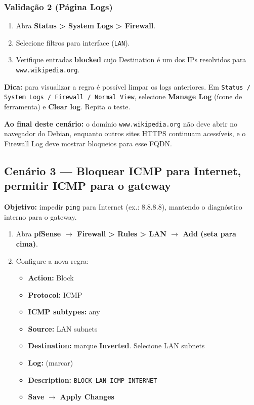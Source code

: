 
\subsubsection*{Validação 2 (Página Logs)}

\begin{enumerate}
\item Abra \textbf{Status > System Logs > Firewall}.
\item Selecione filtros para interface (\texttt{LAN}).
\item Verifique entradas \textbf{blocked} cujo Destination é um dos IPs resolvidos para \texttt{www.wikipedia.org}.
\end{enumerate}


\begin{notebox}
\textbf{Dica:} para visualizar a regra é possível limpar os logs anteriores. Em \texttt{Status / System Logs / Firewall / Normal View}, selecione \textbf{Manage Log} (ícone de ferramenta) e \textbf{Clear log}. Repita o teste.

\textbf{Ao final deste cenário:} o domínio \texttt{www.wikipedia.org} não deve abrir no navegador do Debian, enquanto outros sites HTTPS continuam acessíveis, e o Firewall Log deve mostrar bloqueios para esse FQDN.
\end{notebox}

\subsection{Cenário 3 --- Bloquear ICMP para Internet, permitir ICMP para o gateway}

\textbf{Objetivo:} impedir \texttt{ping} para Internet (ex.: 8.8.8.8), mantendo o diagnóstico interno para o gateway.

\begin{enumerate}
\item Abra \textbf{pfSense $\rightarrow$ Firewall > Rules > LAN $\rightarrow$ Add (seta para cima)}.
\item Configure a nova regra:
\begin{itemize}
  \item \textbf{Action:} Block
  \item \textbf{Protocol:} ICMP
  \item \textbf{ICMP subtypes:} any
  \item \textbf{Source:} LAN subnets
  \item \textbf{Destination:} marque \textbf{Inverted}. Selecione LAN subnets
  \item \textbf{Log:} (marcar)
  \item \textbf{Description:} \texttt{BLOCK\_LAN\_ICMP\_INTERNET}
  \item \textbf{Save} $\rightarrow$ \textbf{Apply Changes}
\end{itemize}
\end{enumerate}

